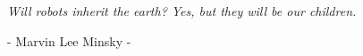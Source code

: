 \documentclass[twoside,b5paper,12pt,openright]{book}
\newcommand{\clearemptydoublepage}{\newpage {\pagestyle{empty} \cleardoublepage}}
\begin{document}
\pagestyle{plain}






\tableofcontents       %

\clearemptydoublepage
\thispagestyle{empty}

\begin{flushright}
	\null{}

	\emph{Will robots inherit the earth? Yes, but they will be our children.}

	\emph{}

	- Marvin Lee Minsky -

	\null
\end{flushright}

\pagestyle{fancy} %



\renewcommand{\sectionmark}[1]{\markright{\thesection.\ #1}}
\renewcommand{\chaptermark}[1]{\markboth{\thechapter.\ #1}{}}

\fancyhf{}

\fancyhead[LE,RO]{\footnotesize \slshape \bfseries \thepage}
\fancyhead[LO]{\footnotesize \slshape \bfseries \rightmark}
\fancyhead[RE]{\footnotesize \slshape \bfseries \leftmark}

\renewcommand{\headrulewidth}{0.5pt}
\renewcommand{\footrulewidth}{0pt}
\addtolength{\headheight}{0.5pt}




\theoremstyle{plain}
\newtheorem{thm}{Theorem}[section]
\newtheorem{cor}[thm]{Corollary}
\newtheorem{lem}[thm]{Lemma}
\newtheorem{prop}[thm]{Proposition}
%
\theoremstyle{definition}
\newtheorem{defn}{Definition}[section]
%
\theoremstyle{remark}
\newtheorem{rem}{Remark}[section]
\end{document}
